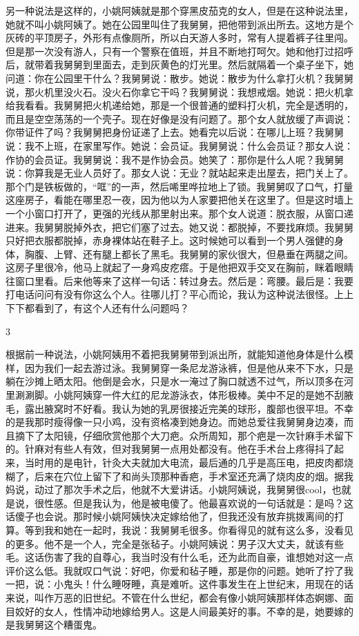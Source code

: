 另一种说法是这样的，小姚阿姨就是那个穿黑皮茄克的女人，但是在这种说法里，她就不叫小姚阿姨了。她在公园里叫住了我舅舅，把他带到派出所去。这地方是个灰砖的平顶房子，外形有点像厕所，所以白天游人多时，常有人提着裤子往里闯。但是那一次没有游人，只有一个警察在值班，并且不断地打呵欠。她和他打过招呼后，就带着我舅舅到里面去，走到灰黄色的灯光里。然后就隔着一个桌子坐下，她问道：你在公园里干什么？我舅舅说：散步。她说：散步为什么拿打火机？我舅舅说，那火机里没火石。没火石你拿它干吗？我舅舅说：我想戒烟。她说：把火机拿给我看看。我舅舅把火机递给她，那是一个很普通的塑料打火机，完全是透明的，而且是空空荡荡的一个壳子。现在好像是没有问题了。那个女人就放缓了声调说：你带证件了吗？我舅舅把身份证递了上去。她看完以后说：在哪儿上班？我舅舅说：我不上班，在家里写作。她说：会员证。我舅舅说：什么会员证？那女人说：作协的会员证。我舅舅说：我不是作协会员。她笑了：那你是什么人呢？我舅舅说：你算我是无业人员好了。那女人说：无业？就站起来走出屋去，把门关上了。那个门是铁板做的，“哐”的一声，然后唏里哗拉地上了锁。我舅舅叹了口气，打量这座房子，看能在哪里忍一夜，因为他以为人家要把他关在这里了。但是这时墙上一个小窗口打开了，更强的光线从那里射出来。那个女人说道：脱衣服，从窗口递进来。我舅舅脱掉外衣，把它们塞了过去。她又说：都脱掉，不要找麻烦。我舅舅只好把衣服都脱掉，赤身裸体站在鞋子上。这时候她可以看到一个男人强健的身体，胸腹、上臂、还有腿上都长了黑毛。我舅舅的家伙很大，但悬垂在两腿之间。这房子里很冷，他马上就起了一身鸡皮疙瘩。于是他把双手交叉在胸前，眯着眼睛往窗口里看。后来他等来了这样一句话：转过身去。然后是：弯腰。最后是：我要打电话问问有没有你这么个人。往哪儿打？平心而论，我认为这种说法很怪。上上下下都看到了，有这个人还有什么问题吗？ 

3 

根据前一种说法，小姚阿姨用不着把我舅舅带到派出所，就能知道他身体是什么模样，因为我们一起去游过泳。我舅舅穿一条尼龙游泳裤，但是他从来不下水，只是躺在沙摊上晒太阳。他倒是会水，只是水一淹过了胸口就透不过气，所以顶多在河里涮涮脚。小姚阿姨穿一件大红的尼龙游泳衣，体形极棒。美中不足的是她不刮腋毛，露出腋窝时不好看。我认为她的乳房很接近完美的球形，腹部也很平坦。不幸的是我那时瘦得像一只小鸡，没有资格凑到她身边。而她总爱往我舅舅身边凑，而且摘下了太阳镜，仔细欣赏他那个大刀疤。众所周知，那个疤是一次针麻手术留下的。针麻对有些人有效，但对我舅舅一点用处都没有。他在手术台上疼得抖了起来，当时用的是电针，针灸大夫就加大电流，最后通的几乎是高压电，把皮肉都烧糊了，后来在穴位上留下了和尚头顶那种香疤，手术室还充满了烧肉皮的烟。据我妈说，动过了那次手术之后，他就不大爱讲话。小姚阿姨说，我舅舅很cool，也就是说，很性感。但是我认为，他是被电傻了。他最喜欢说的一句话就是：是吗？这话傻子也会说。那时候小姚阿姨快决定嫁给他了，但我还没有放弃挑拨离间的打算。等到我和她在一起时，我说：我舅舅毛很多。你看得见的就有这么多，没看见的更多。他不是一个人，完全是张毡子。小姚阿姨说：男子汉大丈夫，就该有些毛。这话伤害了我的自尊心，我当时没有什么毛，还为此而自豪，谁想她对这一点评价这么低。我就叹口气说：好吧，你爱和毡子睡，那是你的问题。她听了拧了我一把，说：小鬼头！什么睡呀睡，真是难听。这件事发生在上世纪末，用现在的话来说，叫作万恶的旧世纪。不管在什么世纪，都会有像小姚阿姨那样体态婀娜、面目姣好的女人，性情冲动地嫁给男人。这是人间最美好的事。不幸的是，她要嫁的是我舅舅这个糟蛋鬼。 

